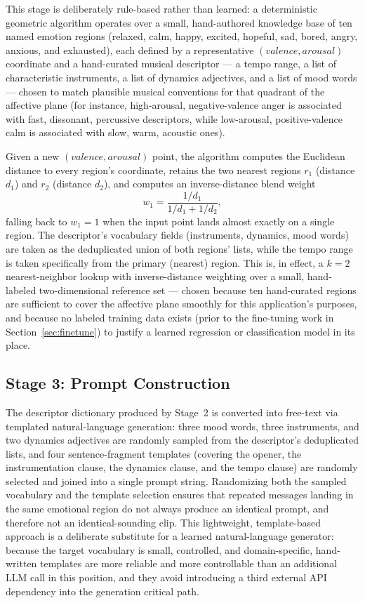 \documentclass[11pt]{article}
\begin{document}
This stage is deliberately rule-based rather than learned: a deterministic geometric algorithm operates over a small, hand-authored knowledge base of ten named emotion regions (relaxed, calm, happy, excited, hopeful, sad, bored, angry, anxious, and exhausted), each defined by a representative $(valence, arousal)$ coordinate and a hand-curated musical descriptor --- a tempo range, a list of characteristic instruments, a list of dynamics adjectives, and a list of mood words --- chosen to match plausible musical conventions for that quadrant of the affective plane (for instance, high-arousal, negative-valence anger is associated with fast, dissonant, percussive descriptors, while low-arousal, positive-valence calm is associated with slow, warm, acoustic ones).

Given a new $(valence, arousal)$ point, the algorithm computes the Euclidean distance to every region's coordinate, retains the two nearest regions $r_1$ (distance $d_1$) and $r_2$ (distance $d_2$), and computes an inverse-distance blend weight
\begin{equation}
w_1 = \frac{1/d_1}{1/d_1 + 1/d_2},
\end{equation}
falling back to $w_1 = 1$ when the input point lands almost exactly on a single region. The descriptor's vocabulary fields (instruments, dynamics, mood words) are taken as the deduplicated union of both regions' lists, while the tempo range is taken specifically from the primary (nearest) region. This is, in effect, a $k=2$ nearest-neighbor lookup with inverse-distance weighting over a small, hand-labeled two-dimensional reference set --- chosen because ten hand-curated regions are sufficient to cover the affective plane smoothly for this application's purposes, and because no labeled training data exists (prior to the fine-tuning work in Section~\ref{sec:finetune}) to justify a learned regression or classification model in its place.

\subsection{Stage 3: Prompt Construction}

The descriptor dictionary produced by Stage~2 is converted into free-text via templated natural-language generation: three mood words, three instruments, and two dynamics adjectives are randomly sampled from the descriptor's deduplicated lists, and four sentence-fragment templates (covering the opener, the instrumentation clause, the dynamics clause, and the tempo clause) are randomly selected and joined into a single prompt string. Randomizing both the sampled vocabulary and the template selection ensures that repeated messages landing in the same emotional region do not always produce an identical prompt, and therefore not an identical-sounding clip. This lightweight, template-based approach is a deliberate substitute for a learned natural-language generator: because the target vocabulary is small, controlled, and domain-specific, hand-written templates are more reliable and more controllable than an additional LLM call in this position, and they avoid introducing a third external API dependency into the generation critical path.
\end{document}
